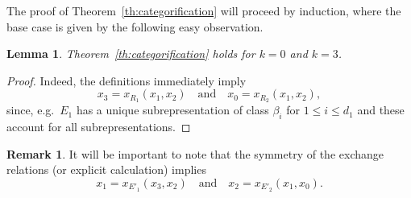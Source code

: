 \documentclass{amsart}
\numberwithin{equation}{section}
\newtheorem{lemma}[theorem]{Lemma}
\theoremstyle{definition}
\newtheorem{remark}[theorem]{Remark}
\begin{document}
The proof of Theorem~\ref{th:categorification} will proceed by induction, where the base case is given by the following easy observation.
\begin{lemma}\label{le:induction base}
  Theorem~\ref{th:categorification} holds for $k=0$ and $k=3$.
\end{lemma}
\begin{proof}
  Indeed, the definitions immediately imply
  \[x_3=x_{R_1}(x_1,x_2)\quad\text{and}\quad x_0=x_{R_2}(x_1,x_2),\]
  since, e.g.\ $E_1$ has a unique subrepresentation of class $\beta_i$ for $1\le i\le d_1$ and these account for all subrepresentations.  
\end{proof}
\begin{remark}\label{rem:induction base}
  It will be important to note that the symmetry of the exchange relations (or explicit calculation) implies
  \[x_1=x_{E'_1}(x_3,x_2)\quad\text{and}\quad x_2=x_{E'_2}(x_1,x_0).\]
\end{remark}
\end{document}
